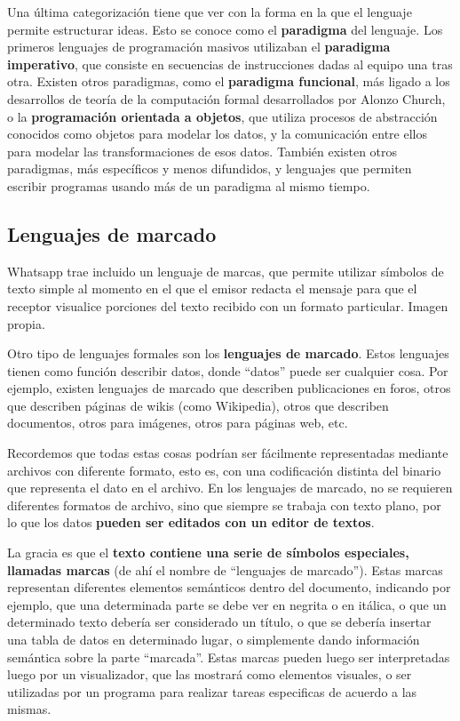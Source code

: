 Una última categorización tiene que ver con la forma en la que el lenguaje
permite estructurar ideas. Esto se conoce como el \textbf{paradigma} del
lenguaje. Los primeros lenguajes de programación masivos utilizaban el
\textbf{paradigma imperativo}, que consiste en secuencias de instrucciones dadas
al equipo una tras otra. Existen otros paradigmas, como el \textbf{paradigma
funcional}, más ligado a los desarrollos de teoría de la computación formal
desarrollados por Alonzo Church, o la \textbf{programación orientada a objetos},
que utiliza procesos de abstracción conocidos como objetos para modelar los
datos, y la comunicación entre ellos para modelar las transformaciones de esos
datos. También existen otros paradigmas, más específicos y menos difundidos, y
lenguajes que permiten escribir programas usando más de un paradigma al mismo
tiempo.


\subsection{Lenguajes de marcado}
\label{chap:informatica:subsec:lenguajes_marcado}

{Whatsapp trae incluido un lenguaje de marcas, que permite utilizar símbolos de
texto simple al momento en el que el emisor redacta el mensaje para que el
receptor visualice porciones del texto recibido con un formato particular.}
{Imagen propia.}

Otro tipo de lenguajes formales son los \textbf{lenguajes de marcado}. Estos
lenguajes tienen como función describir datos, donde ``datos'' puede ser
cualquier cosa. Por ejemplo, existen lenguajes de marcado que describen
publicaciones en foros, otros que describen páginas de wikis (como Wikipedia),
otros que describen documentos, otros para imágenes, otros para páginas web,
etc.

Recordemos que todas estas cosas podrían ser fácilmente representadas mediante
archivos con diferente formato, esto es, con una codificación distinta del
binario que representa el dato en el archivo. En los lenguajes de marcado, no se
requieren diferentes formatos de archivo, sino que siempre se trabaja con texto
plano, por lo que los datos \textbf{pueden ser editados con un editor de
textos}.

La gracia es que el \textbf{texto contiene una serie de símbolos especiales,
llamadas marcas} (de ahí el nombre de ``lenguajes de marcado''). Estas marcas
representan diferentes elementos semánticos dentro del documento, indicando por
ejemplo, que una determinada parte se debe ver en negrita o en itálica, o que un
determinado texto debería ser considerado un título, o que se debería insertar
una tabla de datos en determinado lugar, o simplemente dando información
semántica sobre la parte ``marcada''. Estas marcas pueden luego ser
interpretadas luego por un visualizador, que las mostrará como elementos
visuales, o ser utilizadas por un programa para realizar tareas especificas de
acuerdo a las mismas.

